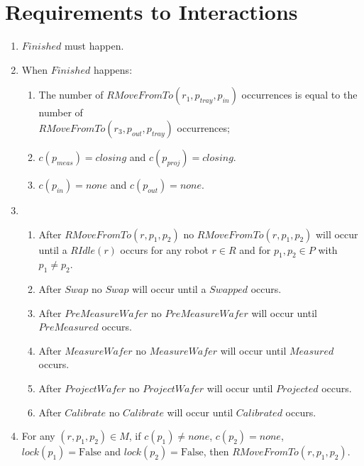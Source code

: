 \section{Requirements to Interactions}

\begin{enumerate}
    \item $\mathit{Finished}$ must happen.

    \item When $\mathit{Finished}$ happens:
    \begin{enumerate}
        \item The number of $\mathit{RMoveFromTo}(r_1, p_\mathit{tray}, p_\mathit{in})$ occurrences is equal to the number of \\$\mathit{RMoveFromTo}(r_3, p_\mathit{out}, p_\mathit{tray})$ occurrences;
        \item $c(p_\mathit{meas}) = \mathit{closing}$ and $c(p_\mathit{proj}) = \mathit{closing}$.
        \item $c(p_\mathit{in}) = \mathit{none}$ and $c(p_\mathit{out}) = \mathit{none}$.
    \end{enumerate}

    \item \begin{enumerate}
        \item After $\mathit{RMoveFromTo}(r, p_1, p_2)$ no $\mathit{RMoveFromTo}(r, p_1, p_2)$ will occur until a $\mathit{RIdle}(r)$ occurs for any robot $r \in R$ and for $p_1, p_2 \in P$ with $p_1 \ne p_2$.
        \item After $\mathit{Swap}$ no $\mathit{Swap}$ will occur until a $\mathit{Swapped}$ occurs.
        \item After $\mathit{PreMeasureWafer}$ no $\mathit{PreMeasureWafer}$ will occur until $\mathit{PreMeasured}$ occurs.
        \item After $\mathit{MeasureWafer}$ no $\mathit{MeasureWafer}$ will occur until $\mathit{Measured}$ occurs.
        \item After $\mathit{ProjectWafer}$ no $\mathit{ProjectWafer}$ will occur until $\mathit{Projected}$ occurs.
        \item After $\mathit{Calibrate}$ no $\mathit{Calibrate}$ will occur until $\mathit{Calibrated}$ occurs.
    \end{enumerate}

    \item For any $(r, p_1, p_2) \in M$, if $c(p_1) \ne \mathit{none}$, $c(p_2) = \mathit{none}$, $\mathit{lock}(p_1) = \text{False}$ and $\mathit{lock}(p_2) = \text{False}$, then $\mathit{RMoveFromTo}(r, p_1, p_2)$. %


\end{enumerate}
